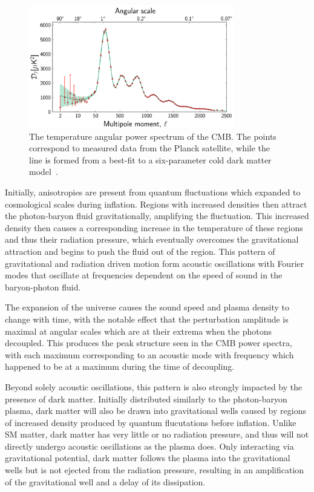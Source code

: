 \begin{figure}[htpb]
	\centering
	\includegraphics[width=0.8\textwidth]{figures/cmb_power_spectrum.png}
	\caption[The temperature angular power spectrum of the CMB]{The temperature angular power spectrum of the CMB. The points correspond to measured data from the Planck satellite, while the line is formed from a best-fit to a six-parameter cold dark matter model~\cite{PlanckCMB}.}
	\label{fig:CMBpowerSpectrum}
\end{figure}

Initially, anisotropies are present from quantum fluctuations which expanded to cosmological scales during inflation.
Regions with increased densities then attract the photon-baryon fluid gravitationally, amplifying the fluctuation.
This increased density then causes a corresponding increase in the temperature of these regions and thus their radiation pressure, which eventually overcomes the gravitational attraction and begins to push the fluid out of the region. 
This pattern of gravitational and radiation driven motion form acoustic oscillations with Fourier modes that oscillate at frequencies dependent on the speed of sound in the baryon-photon fluid.

The expansion of the universe causes the sound speed and plasma density to change with time, with the notable effect that the perturbation amplitude is maximal at angular scales which are at their extrema when the photons decoupled. 
This produces the peak structure seen in the CMB power spectra, with each maximum corresponding to an acoustic mode with frequency which happened to be at a maximum during the time of decoupling.

Beyond solely acoustic oscillations, this pattern is also strongly impacted by the presence of dark matter.
Initially distributed similarly to the photon-baryon plasma, dark matter will also be drawn into gravitational wells caused by regions of increased density produced by quantum flucutations before inflation.
Unlike SM matter, dark matter has very little or no radiation pressure, and thus will not directly undergo acoustic oscillations as the plasma does. 
Only interacting via gravitational potential, dark matter follows the plasma into the gravitational wells but is not ejected from the radiation pressure, resulting in an amplification of the gravitational well and a delay of its dissipation. 

